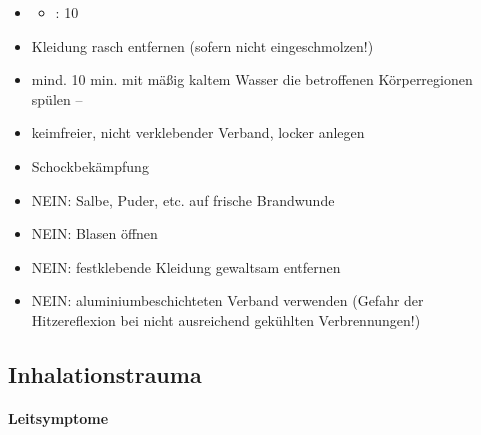 {
\begin{itemize}
  \item \TxMassVitBes
  \begin{itemize}
    \item {}: 10\LMin
  \end{itemize}
  \item Kleidung rasch entfernen (sofern nicht  eingeschmolzen!)
  \item mind. 10 min. mit mäßig kaltem Wasser die betroffenen Körperregionen spülen  --
  \item keimfreier, nicht verklebender Verband, locker anlegen
  \item Schockbekämpfung
\end{itemize}

}

{
\begin{itemize}
    \item NEIN: Salbe, Puder, etc. auf frische  Brandwunde
    \item NEIN: Blasen öffnen
    \item NEIN: festklebende Kleidung gewaltsam  entfernen
    \item NEIN: aluminiumbeschichteten Verband  verwenden (Gefahr der
    Hitzereflexion bei  nicht ausreichend gekühlten  Verbrennungen!)
\end{itemize}
}{

}{}{}{}







\subsection{Inhalationstrauma}
\label{topic:inhalationstrauma}


\paragraph{Leitsymptome}

